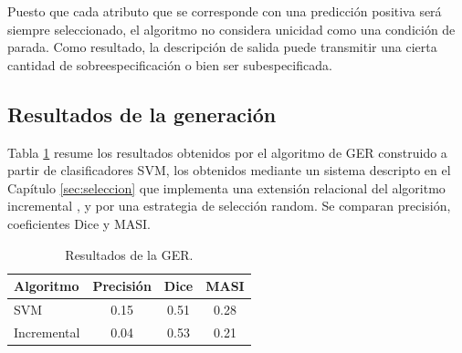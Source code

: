 Puesto que cada atributo que se corresponde con una predicci\'on positiva ser\'a siempre seleccionado, el algoritmo no considera unicidad como una condici\'on de parada. Como resultado, la descripci\'on de salida puede transmitir una cierta cantidad de sobreespecificaci\'on o bien ser subespecificada.


\subsection{Resultados de la generaci\'on }

Tabla \ref{tab-reg-results} resume los resultados obtenidos por el algoritmo de GER construido a partir de clasificadores SVM, los obtenidos mediante un sistema descripto en el Cap\'itulo \ref{sec:seleccion} que implementa una extensi\'on relacional del algoritmo incremental \cite{incremental}, y por una estrategia de selecci\'on random. Se comparan precisi\'on, coeficientes Dice y MASI.

\begin{table}[H]
\begin{center}
\begin{tabular} {  l c c c }
\hline
{Algoritmo}							& {Precisi\'on} 	& { Dice}		& MASI \\ \hline 
SVM											& 0.15		& 0.51			& 0.28 \\
Incremental							& 0.04		& 0.53			& 0.21 \\
\hline
\end{tabular}
\end{center}
\caption{Resultados de la GER.}
\label{tab-reg-results}

\end{table}



